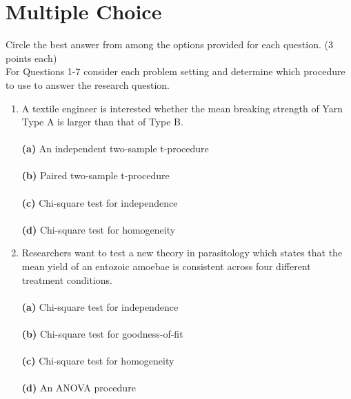 \documentclass[12pt]{article}
\begin{document}
\section{Multiple Choice}
Circle the best answer from among the options provided for each question. (3 points each)\\


\noindent For Questions 1-7 consider each problem setting and determine which procedure to use to answer the research question. 

\begin{enumerate}[leftmargin=\labelsep]
\item A textile engineer is interested whether the mean breaking strength of Yarn Type A is larger than that of Type B. \\ \vspace{1mm}\\
{\bf (a)} \hspace{2mm} An independent two-sample t-procedure\\  \vspace{1mm}\\
{\bf (b)} \hspace{2mm} Paired two-sample t-procedure\\   \vspace{1mm}\\
{\bf (c)} \hspace{2mm} Chi-square test for independence\\  \vspace{1mm}\\
{\bf (d)} \hspace{2mm} Chi-square test for homogeneity\\

\item Researchers want to test a new theory in parasitology which states that the mean yield of an entozoic amoebae is consistent across four different treatment conditions.\\ \vspace{1mm}\\
{\bf (a)} \hspace{2mm} Chi-square test for independence\\ \vspace{1mm}\\
{\bf (b)} \hspace{2mm} Chi-square test for goodness-of-fit\\   \vspace{1mm}\\
{\bf (c)} \hspace{2mm} Chi-square test for homogeneity\\  \vspace{1mm}\\
{\bf (d)} \hspace{2mm} An ANOVA procedure\\  


\end{enumerate}
\end{document}
